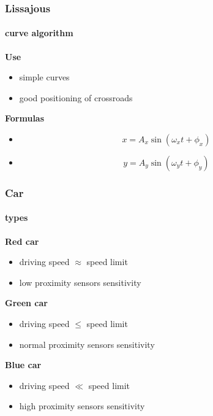 \documentclass{beamer}
\begin{document}
\begin{frame}
	\frametitle{Lissajous}
	\framesubtitle{curve algorithm}

	\begin{block}{\textbf{Use}}
		\begin{itemize}
			\item simple curves
			\item good positioning of crossroads
		\end{itemize}
	\end{block}

	\begin{exampleblock}{\textbf{Formulas}}
		\begin{itemize}
			\item  \[x=A_{x}\sin(\omega _{x}t+\phi _{x})\]
			\item  \[y=A_{y}\sin(\omega _{y}t+\phi _{y})\]
		\end{itemize}
	\end{exampleblock}
\end{frame}

\begin{frame}
	\frametitle{Car}
	\framesubtitle{types}

	\begin{alertblock}{\textbf{Red car}}
		\begin{itemize}
			\item driving speed $\approx$ speed limit
			\item low proximity sensors sensitivity
		\end{itemize}
	\end{alertblock}

	\begin{exampleblock}{\textbf{Green car}}
		\begin{itemize}
			\item driving speed $\le$ speed limit
			\item normal proximity sensors sensitivity
		\end{itemize}
	\end{exampleblock}

	\begin{block}{\textbf{Blue car}}
		\begin{itemize}
			\item driving speed $\ll$ speed limit
			\item high proximity sensors sensitivity
		\end{itemize}
	\end{block}

\end{frame}
\end{document}
